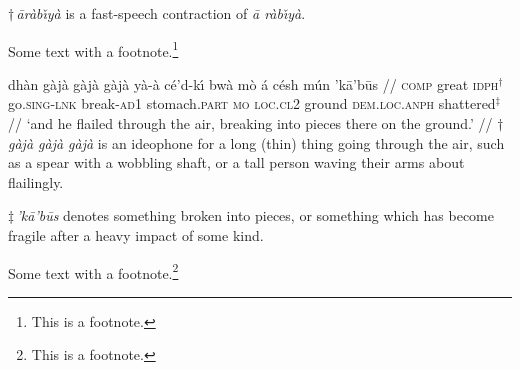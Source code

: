 \medskip
$\dag\,${\sl \=ar\`ab{\v\i}y\`a\/} is a fast-speech contraction of
{\sl \=a r\`ab{\v\i}y\`a}.
\xe

Some text with a footnote.\footnote{This is a footnote.}

\ex
\begingl
{} dh\`an {g\`aj\`a g\`aj\`a g\`aj\`a} y\`a-\`a c\'e'd-k{\'\i} bw\`a
m\`o \'a c\'esh m\'un 'k\=a'b\=us //
\glb \textsc{comp} great \textsc{idph}$^{\dag}$ go.\textsc{sing}-\textsc{lnk}
break-\textsc{ad1} stomach.\textsc{part} \textsc{mo} \textsc{loc.cl2} ground
\textsc{dem.loc.anph} shattered$^{\ddag}$ //
\glft `and he flailed through the air, breaking into pieces there on the
ground.' //
\endgl
\medskip
$\dag\,${\sl g\`aj\`a g\`aj\`a g\`aj\`a\/} is an ideophone for a long (thin)
thing going through the air, such as a spear with a wobbling shaft, or a tall
person waving their arms about flailingly.

$\ddag\,${\sl 'k\=a'b\=us\/} denotes something broken into pieces, or something
which has become fragile after a heavy impact of some kind.
\xe

Some text with a footnote.\footnote{This is a footnote.}

\bye


